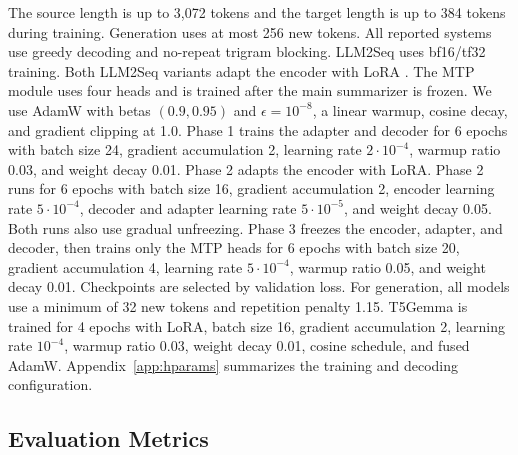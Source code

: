 \documentclass[11pt]{article}
\begin{document}
The source length is up to 3,072 tokens and the target length is up to 384 tokens during training.
Generation uses at most 256 new tokens.
All reported systems use greedy decoding and no-repeat trigram blocking.
LLM2Seq uses bf16/tf32 training.
Both LLM2Seq variants adapt the encoder with LoRA \citep{hu2022lora}.
The MTP module uses four heads and is trained after the main summarizer is frozen.
We use AdamW with betas $(0.9,0.95)$ and $\epsilon=10^{-8}$, a linear warmup, cosine decay, and gradient clipping at 1.0.
Phase 1 trains the adapter and decoder for 6 epochs with batch size 24, gradient accumulation 2, learning rate $2\cdot10^{-4}$, warmup ratio 0.03, and weight decay 0.01.
Phase 2 adapts the encoder with LoRA.
Phase 2 runs for 6 epochs with batch size 16, gradient accumulation 2, encoder learning rate $5\cdot10^{-4}$, decoder and adapter learning rate $5\cdot10^{-5}$, and weight decay 0.05. Both runs also use gradual unfreezing.
Phase 3 freezes the encoder, adapter, and decoder, then trains only the MTP heads for 6 epochs with batch size 20, gradient accumulation 4, learning rate $5\cdot10^{-4}$, warmup ratio 0.05, and weight decay 0.01.
Checkpoints are selected by validation loss.
For generation, all models use a minimum of 32 new tokens and repetition penalty 1.15.
T5Gemma is trained for 4 epochs with LoRA, batch size 16, gradient accumulation 2, learning rate $10^{-4}$, warmup ratio 0.03, weight decay 0.01, cosine schedule, and fused AdamW.
Appendix~\ref{app:hparams} summarizes the training and decoding configuration.

\subsection{Evaluation Metrics}
\end{document}

